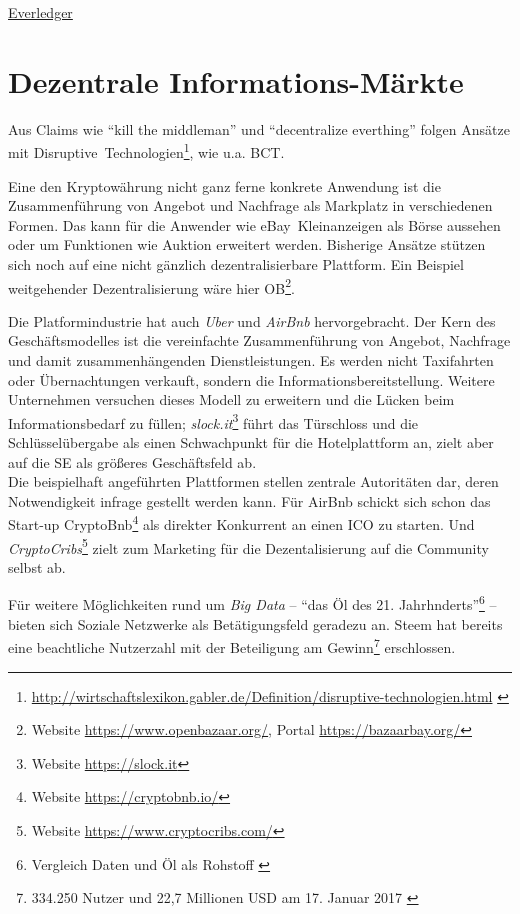 \href{https://www.everledger.io}{Everledger}

\section{Dezentrale Informations-Märkte}

Aus Claims wie \enquote{kill the middleman} und \enquote{decentralize everthing} folgen Ansätze mit \mbox{Disruptive Technologien}\footnote{\url{http://wirtschaftslexikon.gabler.de/Definition/disruptive-technologien.html} \autocite{w:lexika-econimics}}, wie u.a. \gls{BCT}.

Eine den Kryptowährung nicht ganz ferne konkrete Anwendung ist die Zusammenführung von Angebot und Nachfrage als Markplatz in verschiedenen Formen. Das kann für die Anwender wie \mbox{eBay Kleinanzeigen} als Börse aussehen oder um Funktionen wie Auktion erweitert werden. Bisherige Ansätze stützen sich noch auf eine nicht gänzlich dezentralisierbare Plattform. Ein Beispiel weitgehender Dezentralisierung wäre hier \gls{OB}\footnote{Website \url{https://www.openbazaar.org/}, Portal \url{https://bazaarbay.org/}}.

Die Platformindustrie hat auch \emph{Uber} und \emph{AirBnb} hervorgebracht. Der Kern des Geschäftsmodelles ist die vereinfachte Zusammenführung von Angebot, Nachfrage und damit zusammenhängenden Dienstleistungen. Es werden nicht Taxifahrten oder Übernachtungen verkauft, sondern die Informationsbereitstellung. Weitere Unternehmen versuchen dieses Modell zu erweitern und die Lücken beim Informationsbedarf zu füllen; \emph{slock.it}\footnote{Website \url{https://slock.it}} führt das Türschloss und die Schlüsselübergabe als einen Schwachpunkt für die Hotelplattform an, zielt aber auf die \gls{SE} als größeres Geschäftsfeld ab.\\
Die beispielhaft angeführten Plattformen stellen zentrale Autoritäten dar, deren Notwendigkeit infrage gestellt werden kann. Für AirBnb schickt sich schon das Start-up CryptoBnb\footnote{Website \url{https://cryptobnb.io/}} als direkter Konkurrent an einen \gls{ICO} zu starten. Und \emph{CryptoCribs}\footnote{Website \url{https://www.cryptocribs.com/}} zielt zum Marketing für die Dezentalisierung auf die Community selbst ab.

Für weitere Möglichkeiten rund um \emph{Big Data}%
 -- \enquote{das Öl des 21. Jahrhnderts}\footnote{Vergleich Daten und Öl als Rohstoff \autocite{b:spitz-daten}} -- bieten sich Soziale Netzwerke als Betätigungsfeld geradezu an. Steem hat bereits eine beachtliche Nutzerzahl mit der Beteiligung am Gewinn\footnote{334.250 Nutzer und 22,7 Millionen USD am 17. Januar 2017 \autocite{w:steem}} erschlossen. 

